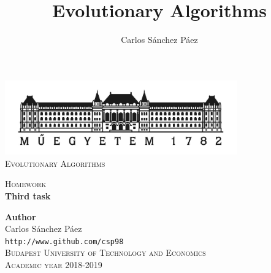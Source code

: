 \documentclass[12pt,english]{article}
\title{Evolutionary Algorithms}
\author{Carlos Sánchez Páez}
\begin{document}
\begin{titlepage}

\newlength{\centeroffset}
\setlength{\centeroffset}{-0.5\oddsidemargin}
\addtolength{\centeroffset}{0.5\evensidemargin}
\thispagestyle{empty}

\noindent\hspace*{\centeroffset}
\begin{minipage}{\textwidth}

\centering
\includegraphics[width=0.75\textwidth]{bme_logo.jpg}\\[1.4cm]

\textsc{ \Large Evolutionary Algorithms\\[4cm]}

\textsc{\Huge Homework}\\[0.75cm]

{\Large\bfseries Third task\\}
\end{minipage}

\vspace{8cm}
\noindent\hspace*{\centeroffset}
\begin{minipage}{\textwidth}
\centering

\textbf{Author}\\ {Carlos Sánchez Páez}\\
\texttt{http://www.github.com/csp98}\\[0.5cm]
\textsc{Budapest University of Technology and Economics}\\
\vspace{1cm}
\textsc{Academic year 2018-2019}
\end{minipage}
\end{titlepage}
\thispagestyle{empty}

\newpage
\end{document}
